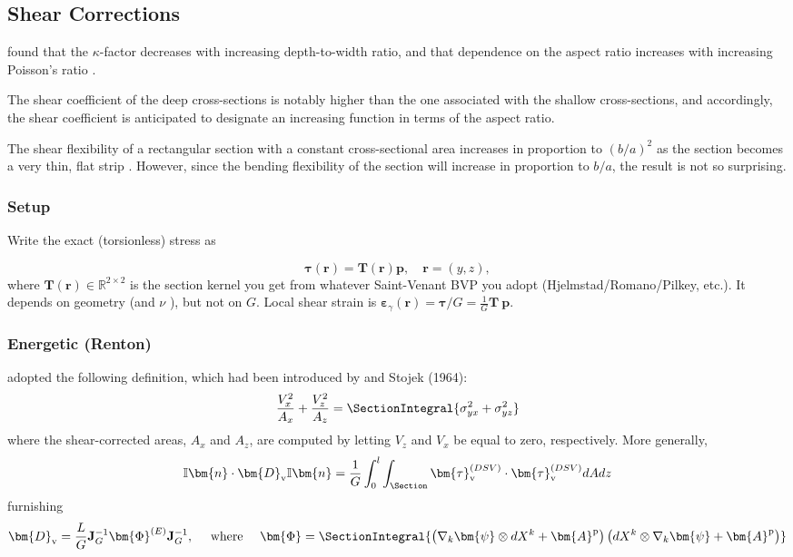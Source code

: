 

\subsection{Shear Corrections}

\cite{puchegger2003experimental} found that the $\kappa$-factor decreases with increasing depth-to-width ratio, and that dependence on the aspect ratio increases with increasing Poisson’s ratio .

The shear coefficient of the deep cross-sections is notably higher than the one associated with the shallow cross-sections, and accordingly, the shear coefficient is anticipated to designate an increasing function in terms of the aspect ratio.

The shear flexibility of a rectangular section with a constant cross-sectional area increases in proportion to $(b / a)^2$ as the section becomes a very thin, flat strip \citep{renton1991generalized}.
However, since the bending flexibility of the section will increase in proportion to $b / a$, the result is not so surprising.

\subsubsection{Setup}
Write the exact (torsionless) stress as

$$
\boldsymbol{\tau}(\bm{r})=\mathbf{T}(\bm{r}) \bm{p}, \quad \bm{r}=(y, z),
$$
where $\mathbf{T}(\bm{r}) \in \mathbb{R}^{2 \times 2}$ is the section kernel you get from whatever Saint-Venant BVP you adopt (Hjelmstad/Romano/Pilkey, etc.). It depends on geometry (and $\nu$ ), but not on $G$. Local shear strain is $\bm{\varepsilon}_{\gamma}(\bm{r})=\bm{\tau} / G=\frac{1}{G} \mathbf{T} \bm{~p}$.

\subsubsection{Energetic (Renton)}
\cite{gruttmann2001shear} adopted the following definition, which had been introduced by \cite{bach1924elastizitaet} and Stojek (1964):
\begin{equation*}
\frac{V_x^2}{A_x}+\frac{V_z^2}{A_z} = \SectionIntegral{\sigma_{y x}^2+\sigma_{y z}^2}
\end{equation*}
where the shear-corrected areas, $A_x$ and $A_z$, are computed by letting $V_z$ and $V_x$ be equal to zero, respectively. 
More generally, \citep{renton1991generalized,serpieri2014equivalence}
$$
\mathbb{I}\bm{n} \cdot \bm{D}_{\mathrm{v}}  \mathbb{I}\bm{n} 
=
\frac{1}{G} \int_0^l \int_{\Section} \bm{\tau}_{\mathrm{v}}^{(D S V)} \cdot \bm{\tau}_{\mathrm{v}}^{(D S V)} d A d z
$$
furnishing
$$
\bm{D}_{\mathrm{v}}=\frac{L}{G} \mathbf{J}_G^{-1} \bm{\Phi}^{(E)} \mathbf{J}_G^{-1},
\quad \text { where } \quad
\bm{\Phi}=\SectionIntegral{\left(\nabla_k \bm{\psi} \otimes dX^k +\bm{A}^{\mathrm{p}}\right)\left(dX^k \otimes \nabla_k \bm{\psi}+\bm{A}^{\mathrm{p}}\right)}
$$

